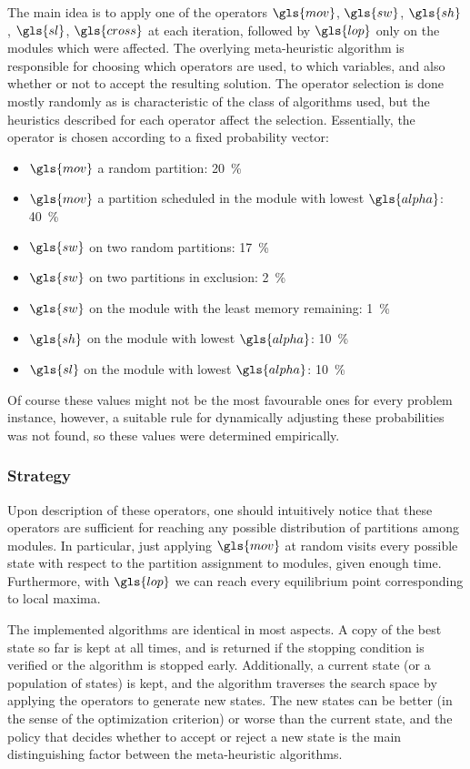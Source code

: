 \documentclass[main.tex]{subfiles}
\begin{document}
The main idea is to apply one of the operators $\gls{mov}$, $\gls{sw}$, $\gls{sh}$, $\gls{sl}$, $\gls{cross}$ at each iteration, followed by $\gls{lop}$ only on the modules which were affected.
The overlying meta-heuristic algorithm is responsible for choosing which operators are used, to which variables, and also whether or not to accept the resulting solution.
The operator selection is done mostly randomly as is characteristic of the class of algorithms used, but the heuristics described for each operator affect the selection.
Essentially, the operator is chosen according to a fixed probability vector:
\begin{itemize}
    \item $\gls{mov}$ a random partition: \SI{20}{\percent}
    \item $\gls{mov}$ a partition scheduled in the module with lowest $\gls{alpha}$: \SI{40}{\percent}
    \item $\gls{sw}$ on two random partitions: \SI{17}{\percent}
    \item $\gls{sw}$ on two partitions in exclusion: \SI{2}{\percent}
    \item $\gls{sw}$ on the module with the least memory remaining: \SI{1}{\percent}
    \item $\gls{sh}$ on the module with lowest $\gls{alpha}$: \SI{10}{\percent}
    \item $\gls{sl}$ on the module with lowest $\gls{alpha}$: \SI{10}{\percent}
\end{itemize}
Of course these values might not be the most favourable ones for every problem instance, however, a suitable rule for dynamically adjusting these probabilities was not found, so these values were determined empirically.

\subsubsection{Strategy}

Upon description of these operators, one should intuitively notice that these operators are sufficient for reaching any possible distribution of partitions among modules.
In particular, just applying $\gls{mov}$ at random visits every possible state with respect to the partition assignment to modules, given enough time.
Furthermore, with $\gls{lop}$ we can reach every equilibrium point corresponding to local maxima.

The implemented algorithms are identical in most aspects. 
A copy of the best state so far is kept at all times, and is returned if the stopping condition is verified or the algorithm is stopped early.
Additionally, a current state (or a population of states) is kept, and the algorithm traverses the search space by applying the operators to generate new states.
The new states can be better (in the sense of the optimization criterion) or worse than the current state, and the policy that decides whether to accept or reject a new state is the main distinguishing factor between the meta-heuristic algorithms.
\end{document}
